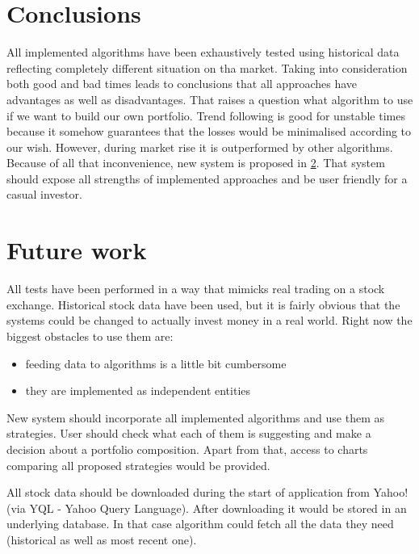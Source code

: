 \section{Conclusions}

All implemented algorithms have been exhaustively tested using historical data reflecting completely different situation on tha market.
Taking into consideration both good and bad times leads to conclusions that all approaches have advantages as well as disadvantages.
That raises a question what algorithm to use if we want to build our own portfolio.
Trend following is good for unstable times because it somehow guarantees that the losses would be minimalised according to our wish.
However, during market rise it is outperformed by other algorithms.
Because of all that inconvenience, new system is proposed in \ref{sec:future}.
That system should expose all strengths of implemented approaches and be user friendly for a casual investor. 


\section{Future work}
\label{sec:future}

All tests have been performed in a way that mimicks real trading on a stock exchange.
Historical stock data have been used, but it is fairly obvious that the systems could be changed to actually invest money in a real world.
Right now the biggest obstacles to use them are:

\begin{itemize}
  \item feeding data to algorithms is a little bit cumbersome
  \item they are implemented as independent entities
\end{itemize}
 
New system should incorporate all implemented algorithms and use them as strategies.
User should check what each of them is suggesting and make a decision about a portfolio composition.
Apart from that, access to charts comparing all proposed strategies would be provided.


All stock data should be downloaded during the start of application from Yahoo! (via YQL - Yahoo Query Language).
After downloading it would be stored in an underlying database.
In that case algorithm could fetch all the data they need (historical as well as most recent one).
 
